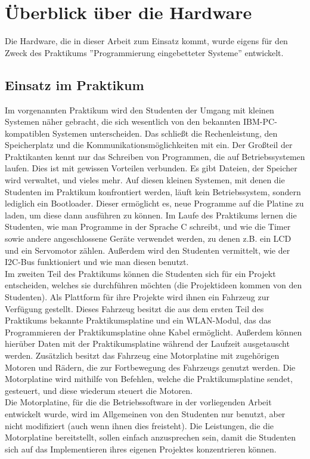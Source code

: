 \chapter{Überblick über die Hardware}
Die Hardware, die in dieser Arbeit zum Einsatz kommt, wurde eigens für den Zweck des Praktikums
''Programmierung eingebetteter Systeme'' entwickelt.

\section{Einsatz im Praktikum}
Im vorgenannten Praktikum wird den Studenten der
Umgang mit kleinen Systemen näher gebracht, die sich wesentlich von den bekannten IBM-PC-kompatiblen
Systemen unterscheiden. Das schließt die Rechenleistung, den Speicherplatz und die
Kommunikationsmöglichkeiten mit ein. 
Der Großteil der Praktikanten kennt nur das Schreiben von Programmen, die auf Betriebssystemen laufen.
Dies ist mit gewissen Vorteilen verbunden. Es gibt
Dateien, der Speicher wird verwaltet, und vieles mehr. Auf diesen kleinen Systemen, mit denen die Studenten im
Praktikum konfrontiert werden, läuft kein Betriebssystem, sondern lediglich ein Bootloader. Dieser
ermöglicht es, neue Programme auf die Platine zu laden, um diese dann ausführen zu können.
Im Laufe des Praktikums lernen die Studenten, wie man Programme in der Sprache C schreibt, und wie die Timer
sowie andere angeschlossene Geräte verwendet werden, zu denen z.B. ein LCD und ein Servomotor zählen.
Außerdem wird den Studenten vermittelt, wie der I2C-Bus funktioniert und wie man diesen benutzt.\\
Im zweiten Teil des Praktikums können die Studenten sich für ein Projekt entscheiden,
welches sie durchführen möchten (die Projektideen kommen von den Studenten).
Als Plattform für ihre Projekte wird ihnen ein Fahrzeug zur Verfügung gestellt. Dieses
Fahrzeug besitzt die aus dem ersten Teil des Praktikums bekannte Praktikumsplatine und ein WLAN-Modul,
das das Programmieren der Praktikumsplatine
ohne Kabel ermöglicht. Außerdem können hierüber Daten mit der Praktikumsplatine während
der Laufzeit ausgetauscht werden. Zusätzlich besitzt das Fahrzeug eine Motorplatine mit
zugehörigen Motoren und Rädern, die zur Fortbewegung des Fahrzeugs genutzt werden. Die
Motorplatine wird mithilfe von Befehlen, welche die Praktikumsplatine sendet, gesteuert, und
diese wiederum steuert die Motoren.\\
Die Motorplatine, für die die Betriebssoftware in der vorliegenden Arbeit entwickelt wurde, wird
im Allgemeinen von den Studenten nur benutzt, aber nicht modifiziert (auch wenn ihnen dies
freisteht). Die Leistungen, die die Motorplatine bereitstellt, 
sollen einfach anzusprechen sein, damit die Studenten sich auf das Implementieren
ihres eigenen Projektes konzentrieren können.\\

